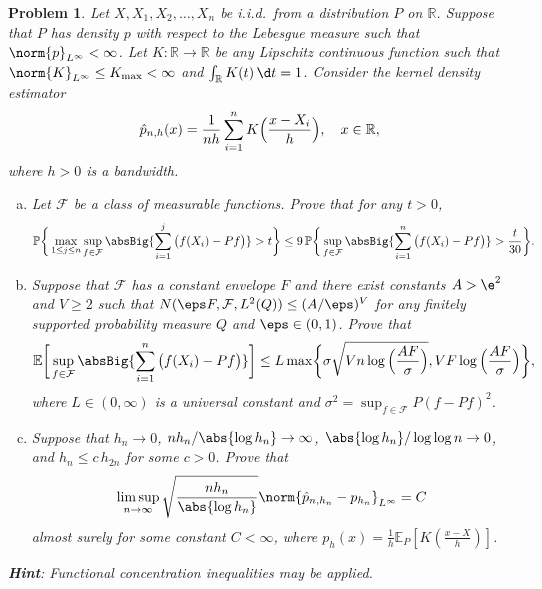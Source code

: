 \documentclass[11pt, a3paper, openany]{article}
\newcommand{\R}{\ensuremath{\mathbb{R}}}
\renewcommand{\P}{\mathbb{P}}
\newcommand{\E}{\mathbb{E}}
\theoremstyle{remark}
\theoremstyle{remark}
\theoremstyle{remark}
\newenvironment{Proof of claim}
  {\begin{proof}[\normalfont \textbf{Proof of claim}]}
  {\end{proof}}
\theoremstyle{definition}
\theoremstyle{remark}
\theoremstyle{plain}
\newtheorem{Prob}{Problem}
\begin{document}
\begin{Prob}
Let $X,X_{1},X_{2},\dots,X_{n}$ be i.i.d.\ from a distribution $P$ on $\R$. Suppose that $P$ has density $p$ with respect to the Lebesgue measure such that $\norm{p}_{L^\infty} < \infty$. Let $K : \R \to \R$ be any Lipschitz continuous function such that $\norm{K}_{L^\infty} \leq K_{\max} < \infty$ and $\int_{\R} K(t) \,\d t = 1$. Consider the kernel density estimator \vspace{-1ex}
\[ \hat{p}_{n,h}(x) = \frac{1}{nh} \sum_{i=1}^{n} K\Big(\frac{x-X_{i}}{h}\Big) , \quad x \in \R , \vspace{-2ex}\]
where $h > 0$ is a bandwidth. 
\begin{enumerate}[(a)]
	\setlength{\itemsep}{0pt}
\item Let $\mathcal{F}$ be a class of measurable functions. Prove that for any $t>0$, \vspace{-2ex}
\[ \P\bigg\{ \max_{1 \leq j \leq n} \sup_{f\in\mathcal{F}} \absBig{\sum_{i=1}^{j}\big(f(X_{i})-Pf\big)} > t \bigg\} \leq 9 \, \P\bigg\{ \sup_{f\in\mathcal{F}} \absBig{\sum_{i=1}^{n}\big(f(X_{i})-Pf\big)} > \frac{t}{30} \bigg\} . \vspace{-2ex}\]
\item Suppose that $\mathcal{F}$ has a constant  envelope $F$ and there exist constants $A > \e^{2}$ and $V \geq 2$ such that $N(\eps F, \mathcal{F}, L^{2}(Q)) \leq (A/\eps)^{V}$ for any finitely supported probability measure $Q$ and $\eps \in (0,1)$. Prove that \vspace{-1ex}
\[ \E\bigg[ \sup_{f\in\mathcal{F}} \absBig{\sum_{i=1}^{n}\big(f(X_{i})-Pf\big)} \bigg] \leq L \max\biggl\{ \sigma\sqrt{Vn\log\Big(\frac{AF}{\sigma}\Big)} , VF\log\Big(\frac{AF}{\sigma}\Big) \biggr\} , \vspace{-1ex}\]
where $L \in (0,\infty)$ is a universal constant and $\sigma^{2} = \sup_{f\in\mathcal{F}} P(f-Pf)^{2}$. 
\item Suppose that $h_{n} \to 0$, $nh_{n}/\abs{\log h_{n}} \to \infty$, $\abs{\log h_{n}} / \log\log n \to 0$, and $h_{n} \leq c \, h_{2n}$ for some $c > 0$. Prove that \vspace{-1ex}
\[ \limsup_{n\to\infty} \sqrt{\frac{nh_{n}}{\abs{\log h_{n}}}} \norm{\hat{p}_{n,h_{n}}-p_{h_{n}}}_{L^\infty} = C \]
almost surely for some constant $C < \infty$, where $p_{h}(x) = \frac{1}{h}\E_{P}[K(\frac{x-X}{h})]$. 
\end{enumerate}
\normalfont \textbf{Hint}: Functional concentration inequalities may be applied.
\end{Prob}
\end{document}
